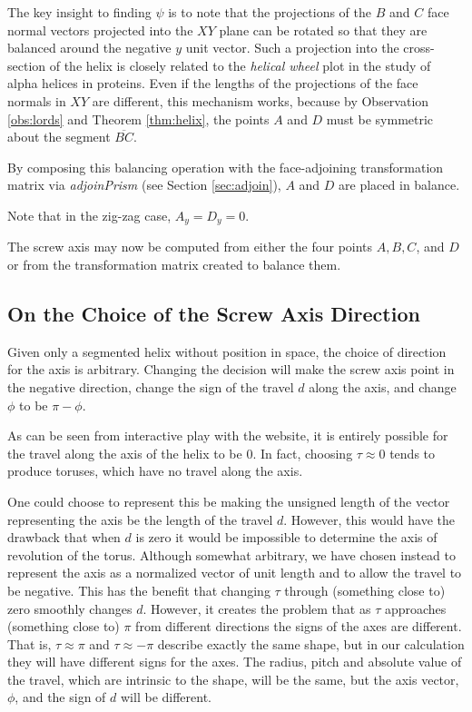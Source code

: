 \documentclass[11pt]{article}
\newenvironment{sketch}{%
  \renewcommand{\proofname}{Proof Sketch}\proof}{\endproof}
\begin{document}
{\begin{sketch}
The key insight to finding $\psi$ is to note that
the projections of the $B$ and $C$ face normal vectors
projected into the $XY$ plane can be rotated so that they
are balanced around the negative $y$ unit vector.
Such a projection into the cross-section of the helix is closely related to
the {\em helical wheel}\cite{wiki:helicalwheel} plot
in the study of alpha helices in proteins.
Even if the lengths of the projections of the face normals in $XY$
are different, this mechanism works, because by Observation \ref{obs:lords} and Theorem \ref{thm:helix},
the points $A$ and $D$ must be symmetric about the segment $\overline{BC}$.

By composing this balancing operation with the face-adjoining transformation
matrix via {\em adjoinPrism} (see Section \ref{sec:adjoin}), $A$ and $D$ are placed in balance.

Note that in the zig-zag case, $A_y = D_y = 0$.

\end{sketch}

The screw axis may now
be computed from either the four points $A,B,C$, and $D$ or from the transformation
matrix created to balance them.

\subsection{On the Choice of the Screw Axis Direction}

Given only a segmented helix without position in space,
the choice of
direction for the axis is arbitrary.
Changing the decision will make the screw axis point in the negative direction,
change the sign of the travel $d$ along the axis, and change $\phi$ to be $\pi - \phi$.

As can be seen from interactive play with the website\cite{segmentedhelixinteractive},
it is entirely possible for the travel along
the axis of the helix to be $0$. In fact, choosing $\tau \approx 0$
tends to produce toruses, which have no
travel along the axis.

One could choose to represent this be making the unsigned length of the vector
representing the axis be the length of the
travel $d$.
However, this would have the drawback that when $d$ is zero it would be impossible to determine
the axis of revolution of the torus.
Although somewhat arbitrary, we have chosen instead to represent the
axis as a normalized vector of unit length
and to allow the travel to be negative. This has the benefit that
changing $\tau$ through (something close to)
zero smoothly changes $d$. However, it creates the problem that as $\tau$ approaches
(something close to) $\pi$ from different directions the signs of the axes are different.
That is, $\tau \approx \pi$ and $\tau \approx -\pi$ describe exactly
the same shape, but in our calculation
they will have different signs for the axes. The radius, pitch and
absolute value of the travel,
which are intrinsic to the shape, will be the same,
but the axis vector, $\phi$, and the sign of $d$ will be different.

}
\end{document}
